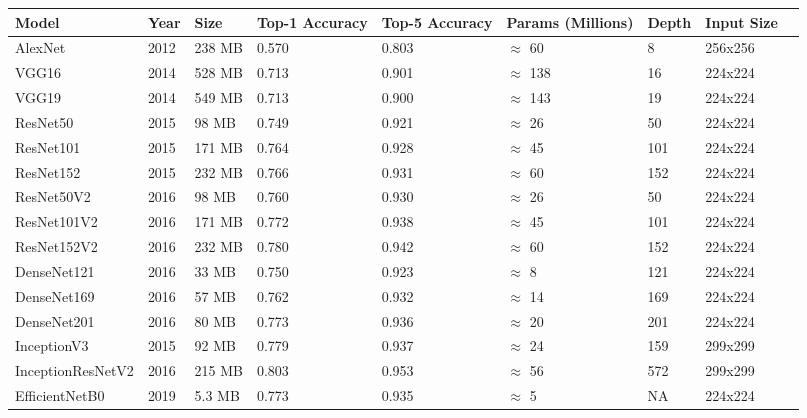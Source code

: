     \begin{table}[h]
        \centering
        \begin{tabularx}{\textwidth}{|l|X|X|X|X|X|X|X|X|}
            \hline
            Model & Year & Size & Top-1 Accuracy & Top-5 Accuracy & Params (Millions) & Depth & Input Size \\ \hline
            AlexNet \cite{alexnet} & 2012 & 238 MB & 0.570 & 0.803 & $\approx$ 60 & 8 & 256x256 \\ \hline
            VGG16 \cite{vggnet} & 2014 & 528 MB & 0.713 & 0.901 & $\approx$ 138 & 16 & 224x224 \\ \hline
            VGG19 \cite{vggnet} & 2014 & 549 MB & 0.713 & 0.900 & $\approx$ 143 & 19 & 224x224 \\ \hline
            ResNet50 \cite{resnet} & 2015 & 98 MB & 0.749 & 0.921 & $\approx$ 26 & 50 & 224x224 \\ \hline
            ResNet101 \cite{resnet} & 2015 & 171 MB & 0.764 & 0.928 & $\approx$ 45 & 101 & 224x224 \\ \hline
            ResNet152 \cite{resnet} & 2015 & 232 MB & 0.766 & 0.931 & $\approx$ 60 & 152 & 224x224 \\ \hline
            ResNet50V2 \cite{resnetv2} & 2016 & 98 MB & 0.760 & 0.930 & $\approx$ 26 & 50 & 224x224 \\ \hline
            ResNet101V2 \cite{resnetv2} & 2016 & 171 MB & 0.772 & 0.938 & $\approx$ 45 & 101 & 224x224 \\ \hline
            ResNet152V2 \cite{resnetv2} & 2016 & 232 MB & 0.780 & 0.942 & $\approx$ 60 & 152 & 224x224 \\ \hline
            DenseNet121 \cite{densenet} & 2016 & 33 MB & 0.750 & 0.923 & $\approx$ 8 & 121 & 224x224 \\ \hline
            DenseNet169 \cite{densenet} & 2016 & 57 MB & 0.762 & 0.932 & $\approx$ 14 & 169 & 224x224 \\ \hline
            DenseNet201 \cite{densenet} & 2016 & 80 MB & 0.773 & 0.936 & $\approx$ 20 & 201 & 224x224 \\ \hline
            InceptionV3 \cite{inceptionv3} & 2015 & 92 MB & 0.779 & 0.937 & $\approx$ 24 & 159 & 299x299 \\ \hline
            InceptionResNetV2 \cite{inceptionv4} & 2016 & 215 MB & 0.803 & 0.953 & $\approx$ 56 & 572 & 299x299 \\ \hline
            EfficientNetB0 \cite{efficientnet} & 2019 & 5.3 MB & 0.773 & 0.935 & $\approx$ 5 & NA & 224x224 \\ \hline

\end{tabularx}
\end{table}
